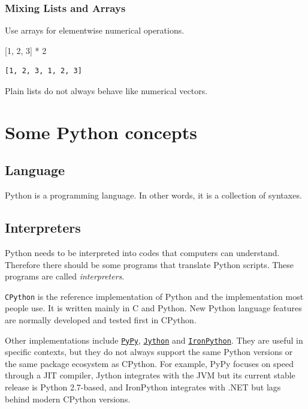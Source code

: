 \documentclass[
  letterpaper,
  DIV=11,
  numbers=noendperiod]{scrreprt}
\newenvironment{Shaded}{\begin{snugshade}}{\end{snugshade}}
\newcommand{\DecValTok}[1]{\textcolor[rgb]{0.68,0.00,0.00}{#1}}
\newcommand{\NormalTok}[1]{\textcolor[rgb]{0.00,0.23,0.31}{#1}}
\newcommand{\OperatorTok}[1]{\textcolor[rgb]{0.37,0.37,0.37}{#1}}
\theoremstyle{definition}
\theoremstyle{definition}
\theoremstyle{plain}
\theoremstyle{plain}
\theoremstyle{remark}
\begin{document}
\subsection{Mixing Lists and Arrays}\label{mixing-lists-and-arrays}

Use arrays for elementwise numerical operations.

\begin{Shaded}
\begin{Highlighting}[]
\NormalTok{[}\DecValTok{1}\NormalTok{, }\DecValTok{2}\NormalTok{, }\DecValTok{3}\NormalTok{] }\OperatorTok{*} \DecValTok{2}
\end{Highlighting}
\end{Shaded}

\begin{verbatim}
[1, 2, 3, 1, 2, 3]
\end{verbatim}

Plain lists do not always behave like numerical vectors.

\chapter{Some Python concepts}\label{some-python-concepts}

\section{Language}\label{language}

Python is a programming language. In other words, it is a collection of
syntaxes.

\section{Interpreters}\label{interpreters}

Python needs to be interpreted into codes that computers can understand.
Therefore there should be some programs that translate Python scripts.
These programs are called \emph{interpreters}.

\texttt{CPython} is the reference implementation of Python and the
implementation most people use. It is written mainly in C and Python.
New Python language features are normally developed and tested first in
CPython.

Other implementations include
\href{https://www.pypy.org/}{\texttt{PyPy}},
\href{https://www.jython.org/}{\texttt{Jython}} and
\href{https://ironpython.net/}{\texttt{IronPython}}. They are useful in
specific contexts, but they do not always support the same Python
versions or the same package ecosystem as CPython. For example, PyPy
focuses on speed through a JIT compiler, Jython integrates with the JVM
but its current stable release is Python 2.7-based, and IronPython
integrates with .NET but lags behind modern CPython versions.
\end{document}
